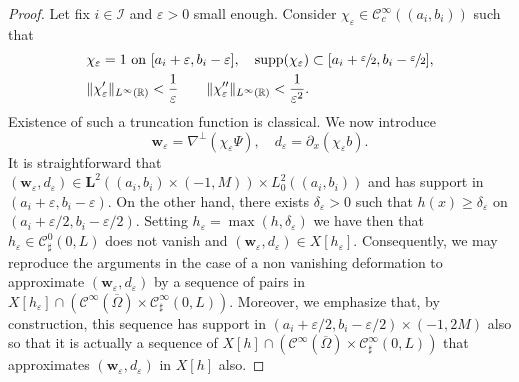 \documentclass[11pt]{article}
\let\mathcal\mathscr
\theoremstyle{remark}
\theoremstyle{definition}
\newcommand{\wg}{\boldsymbol{w}}
\newcommand{\BS}[1]{\boldsymbol{#1}}
\begin{document}
\begin{proof}
Let fix $i \in \mathcal I$ and $\varepsilon>0$ small enough. Consider $\chi_{\varepsilon} \in \mathcal{C}^{\infty}_{c}((a_{i},b_{i}))$ such that
\[
\begin{aligned}
& \chi_{\varepsilon}=1 \text{ on $[a_{i}+\varepsilon,b_{i}-\varepsilon]$},
\quad
\text{supp}(\chi_{\varepsilon})\subset[a_{i}+\sfrac{\varepsilon}{2},b_{i}-\sfrac{\varepsilon}{2}], \\
& \|\chi_{\varepsilon}'\|_{L^{\infty}(\mathbb R)}<\frac{1}{\varepsilon}
\qquad \|\chi_{\varepsilon}''\|_{L^{\infty}(\mathbb R)}<\frac{1}{\varepsilon^{2}}.
\end{aligned}
\]
Existence of such a truncation function is classical.
We now introduce
\[
\wg_\varepsilon=\nabla^{\perp}(\chi_{\varepsilon}\Psi), \quad
d_{\varepsilon} = \partial_x (\chi_{\varepsilon}b).
\]
It is straightforward that $(\wg_{\varepsilon},d_{\varepsilon}) \in \BS L^2((a_{i},b_{i}) \times (-1,M)) \times L^2_0((a_{i},b_{i}))$ and has support in $(a_i+\varepsilon,b_i-\varepsilon)$. On the other hand, there exists $\delta_{\varepsilon}>0$ such that $h(x)\geq \delta_{\varepsilon}$
on $(a_i+\varepsilon/2,b_i-\varepsilon/2)$. Setting $h_{\varepsilon} = \max(h,\delta_{\varepsilon})$ we have then that $h_{\varepsilon} \in \mathcal C^0_{\sharp}(0,L)$ does not vanish and $(\wg_{\varepsilon},d_{\varepsilon}) \in X[h_{\varepsilon}]$. Consequently, we may reproduce the arguments in the case of a non vanishing deformation to approximate $(\wg_{\varepsilon},d_{\varepsilon})$ by a sequence of pairs
in $X[h_{\varepsilon}] \cap (\mathcal C^{\infty}(\overline{\Omega}) \times \mathcal C^{\infty}_{\sharp}(0,L))$. Moreover, we emphasize that,
by construction, this sequence has support in $(a_i+\varepsilon/2,b_i-\varepsilon/2)\times (-1,2M)$ also so that it is actually a sequence of $X[h] \cap (\mathcal C^{\infty}(\overline{\Omega}) \times \mathcal C^{\infty}_{\sharp}(0,L))$ that approximates $(\wg_{\varepsilon},d_{\varepsilon})$ in $X[h]$ also.


\end{proof}
\end{document}

